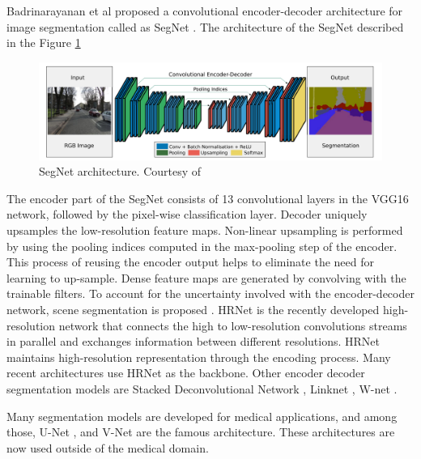     Badrinarayanan et al proposed a convolutional encoder-decoder architecture for image segmentation called as SegNet \cite{62_badrinarayanan2017segnet}. The architecture of the SegNet described in the Figure \ref{fig:segnet}  
    
    \begin{figure}[h]
    	\centering
    	\includegraphics[width=14cm]{images/segnet.png}
    	\caption{SegNet architecture. Courtesy of \cite{62_badrinarayanan2017segnet}}
    	\label{fig:segnet}
    \end{figure} 
    
    The encoder part of the SegNet consists of 13 convolutional layers in the VGG16 network, followed by the pixel-wise classification layer. Decoder uniquely upsamples the low-resolution feature maps. Non-linear upsampling is performed by using the pooling indices computed in the max-pooling step of the encoder. This process of reusing the encoder output helps to eliminate the need for learning to up-sample. Dense feature maps are generated by convolving with the trainable filters. To account for the uncertainty involved with the encoder-decoder network, scene segmentation is proposed \cite{65_kendall2015bayesian}. HRNet \cite{66_sun2019high} is the recently developed high-resolution network that connects the high to low-resolution convolutions streams in parallel	and exchanges information between different resolutions. HRNet maintains high-resolution representation through the encoding process. Many recent architectures use HRNet as the backbone. Other encoder decoder segmentation models are Stacked Deconvolutional Network \cite{67_fu2019stacked}, Linknet \cite{68_hu2018learning}, W-net \cite{69_xia2017w}.

	Many segmentation models are developed for medical applications, and among those, U-Net \cite{70_ronneberger2015u}, and V-Net \cite{71_milletari2016v} are the famous architecture. These architectures are now used outside of the medical domain.
    
